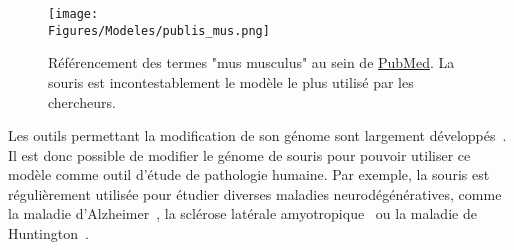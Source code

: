 \documentclass[\main/main.tex]{subfiles}
\begin{document}
\begin{figure}[h!]{\textwidth} 
    \centering
       \centering \texttt{[image: \\Figures/Modeles/publis\_mus.png]}
       \caption{
            \label{fig:model:mm:stats}Référencement des termes "mus musculus" au sein de \href{https://pubmed.ncbi.nlm.nih.gov/?term=mus+musculus&sort=pubdate}{PubMed}.\newline
            La souris est incontestablement le modèle le plus utilisé par les chercheurs.
            }
\end{figure}

%
Les outils permettant la modification de son génome sont largement développés~\cite{lanigan_2020}.
%
Il est donc possible de modifier le génome de souris pour pouvoir utiliser ce modèle comme outil d'étude de pathologie humaine.
%
Par exemple, la souris est régulièrement utilisée pour étudier diverses maladies neurodégénératives,
comme la maladie d'Alzheimer~\cite{han_2020,thadathil_2020,shin_2020},
la sclérose latérale amyotropique~\cite{Ahmed_2020,konopka_2020,mcleod_2020}
ou la maladie de Huntington~\cite{deng_2020,dridi_2020,pfister_2020}.

\end{document}

